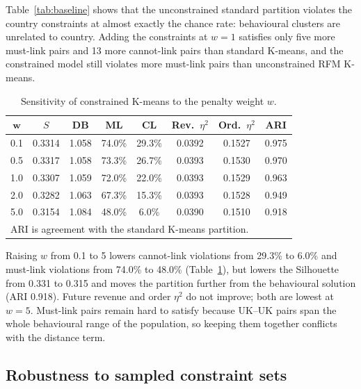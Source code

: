 \documentclass[conference,10pt]{IEEEtran}
\newcommand{\etasq}{\eta^{2}}
\begin{document}
Table~\ref{tab:baseline} shows that the unconstrained standard partition
violates the country constraints at almost exactly the chance rate:
behavioural clusters are unrelated to country. Adding the constraints at
$w=1$ satisfies only five more must-link pairs and 13 more cannot-link pairs
than standard K-means, and the constrained model still violates more
must-link pairs than unconstrained RFM K-means.

\begin{table}[t]
\centering
\caption{Sensitivity of constrained K-means to the penalty weight $w$.}
\label{tab:weights}
\footnotesize
\setlength{\tabcolsep}{2.6pt}
\begin{tabular}{cccccccc}
\toprule
$\boldsymbol{w}$ & \textbf{$S$} & \textbf{DB} & \textbf{ML} & \textbf{CL} &
\textbf{Rev.\ $\etasq$} & \textbf{Ord.\ $\etasq$} & \textbf{ARI}\\
\midrule
0.1 & 0.3314 & 1.058 & 74.0\% & 29.3\% & 0.0392 & 0.1527 & 0.975\\
0.5 & 0.3317 & 1.058 & 73.3\% & 26.7\% & 0.0393 & 0.1530 & 0.970\\
1.0 & 0.3307 & 1.059 & 72.0\% & 22.0\% & 0.0393 & 0.1529 & 0.963\\
2.0 & 0.3282 & 1.063 & 67.3\% & 15.3\% & 0.0393 & 0.1528 & 0.949\\
5.0 & 0.3154 & 1.084 & 48.0\% &  6.0\% & 0.0390 & 0.1510 & 0.918\\
\bottomrule
\multicolumn{8}{l}{\scriptsize ARI is agreement with the standard K-means partition.}
\end{tabular}
\end{table}


Raising $w$ from 0.1 to 5 lowers cannot-link violations from 29.3\% to 6.0\%
and must-link violations from 74.0\% to 48.0\% (Table~\ref{tab:weights}), but lowers the Silhouette from 0.331 to 0.315 and
moves the partition further from the behavioural solution (ARI 0.918).
Future revenue and order $\etasq$ do not improve; both are lowest at $w=5$.
Must-link pairs remain hard to satisfy because UK--UK pairs span the whole
behavioural range of the population, so keeping them together conflicts with
the distance term.

\subsection{Robustness to sampled constraint sets}
\end{document}
